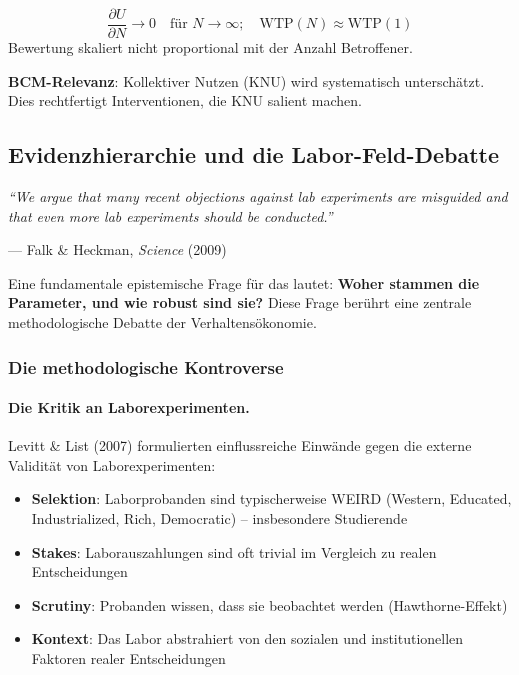 \begin{axiom}
\begin{equation}
\frac{\partial U}{\partial N} \rightarrow 0 \quad \text{für } N \rightarrow \infty; \quad \text{WTP}(N) \approx \text{WTP}(1)
\end{equation}
Bewertung skaliert nicht proportional mit der Anzahl Betroffener.

\textbf{BCM-Relevanz}: Kollektiver Nutzen (KNU) wird systematisch unterschätzt. Dies rechtfertigt Interventionen, die KNU salient machen.
\end{axiom}

\subsection{Evidenzhierarchie und die Labor-Feld-Debatte}

\epigraph{\textit{``We argue that many recent objections against lab experiments are misguided and that even more lab experiments should be conducted.''}}{--- Falk \& Heckman, \textit{Science} (2009)}

Eine fundamentale epistemische Frage für das \BCM{} lautet: \textbf{Woher stammen die Parameter, und wie robust sind sie?} Diese Frage berührt eine zentrale methodologische Debatte der Verhaltensökonomie.

\subsubsection{Die methodologische Kontroverse}

\paragraph{Die Kritik an Laborexperimenten.}
Levitt \& List (2007) formulierten einflussreiche Einwände gegen die externe Validität von Laborexperimenten:
\begin{itemize}
    \item \textbf{Selektion}: Laborprobanden sind typischerweise WEIRD (Western, Educated, Industrialized, Rich, Democratic) -- insbesondere Studierende
    \item \textbf{Stakes}: Laborauszahlungen sind oft trivial im Vergleich zu realen Entscheidungen
    \item \textbf{Scrutiny}: Probanden wissen, dass sie beobachtet werden (Hawthorne-Effekt)
    \item \textbf{Kontext}: Das Labor abstrahiert von den sozialen und institutionellen Faktoren realer Entscheidungen
\end{itemize}

